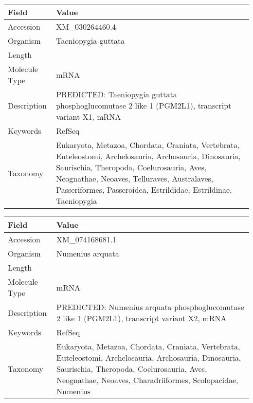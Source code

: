 \documentclass[10pt]{article}
\begin{document}
\vspace{1em}
{\footnotesize
\begin{longtable}{>{\raggedright\arraybackslash}p{4.5cm} >{\raggedright\arraybackslash}p{11.5cm}}
\textbf{Field} & \textbf{Value} \\
\hline
Accession & XM\_030264460.4 \\
Organism & Taeniopygia guttata \\
Length & 6033 \\
Molecule Type & mRNA \\
Description & PREDICTED: Taeniopygia guttata phosphoglucomutase 2 like 1 (PGM2L1), transcript variant X1, mRNA \\
Keywords & RefSeq \\
Taxonomy & Eukaryota, Metazoa, Chordata, Craniata, Vertebrata, Euteleostomi, Archelosauria, Archosauria, Dinosauria, Saurischia, Theropoda, Coelurosauria, Aves, Neognathae, Neoaves, Telluraves, Australaves, Passeriformes, Passeroidea, Estrildidae, Estrildinae, Taeniopygia \\
\end{longtable}
}

\vspace{1em}
{\footnotesize
\begin{longtable}{>{\raggedright\arraybackslash}p{4.5cm} >{\raggedright\arraybackslash}p{11.5cm}}
\textbf{Field} & \textbf{Value} \\
\hline
Accession & XM\_074168681.1 \\
Organism & Numenius arquata \\
Length & 2051 \\
Molecule Type & mRNA \\
Description & PREDICTED: Numenius arquata phosphoglucomutase 2 like 1 (PGM2L1), transcript variant X2, mRNA \\
Keywords & RefSeq \\
Taxonomy & Eukaryota, Metazoa, Chordata, Craniata, Vertebrata, Euteleostomi, Archelosauria, Archosauria, Dinosauria, Saurischia, Theropoda, Coelurosauria, Aves, Neognathae, Neoaves, Charadriiformes, Scolopacidae, Numenius \\
\end{longtable}
}
\end{document}
